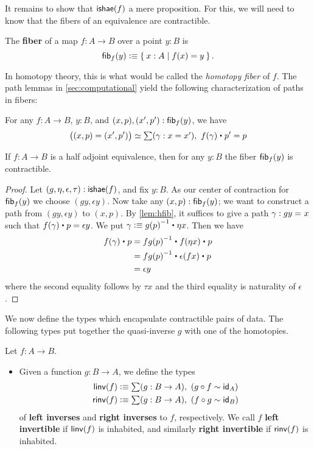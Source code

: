 It remains to show that $\mathsf{ishae}(f)$ a mere proposition.
For this, we will need to know that the fibers of an equivalence are contractible.

\begin{defn}
  The \textbf{fiber} of a map $f:A\to B$ over a point $y:B$ is
  \[ \mathsf{fib}_{f}(y) \vcentcolon\equiv \Set{x:A | f(x) = y}.\]
\end{defn}

In homotopy theory, this is what would be called the \emph{homotopy fiber} of $f$.
The path lemmas in \autoref{sec:computational} yield the following characterization of paths in fibers:

\begin{lem}\label{lem:hfib}
  For any $f : A \to B$, $y : B$, and $(x,p),(x',p') : \mathsf{fib}_{f}(y)$, we have
  \[ \big((x,p) = (x',p')\big) \simeq \sm{\gamma : x = x'} f(\gamma) \ct p' = p \qedhere\]
\end{lem}

\begin{thm}\label{thm:contr-hae}
  If $f:A\to B$ is a half adjoint equivalence, then for any $y:B$ the fiber $\mathsf{fib}_{f}(y)$ is contractible.
\end{thm}
\begin{proof}
  Let $(g,\eta,\epsilon,\tau) : \mathsf{ishae}(f)$, and fix $y : B$.
  As our center of contraction for $\mathsf{fib}_{f}(y)$ we choose $(gy, \epsilon y)$.
  Now take any $(x,p) : \mathsf{fib}_{f}(y)$; we want to construct a path from $(gy, \epsilon y)$ to $(x,p)$.
  By \autoref{lem:hfib}, it suffices to give a path $\gamma : gy =_{} x$ such that $\ap f\gamma \ct p = \epsilon y$.
  We put $\gamma \defeq \opp{g(p)} \ct \eta x$.
  Then we have 
  \begin{align*}
    f(\gamma) \ct p & = \opp{fg(p)} \ct f (\eta x) \ct p \\
    & = \opp{fg(p)} \ct \epsilon(fx) \ct p \\
    & = \epsilon y
  \end{align*}
  where the second equality follows by $\tau x$ and the third equality is naturality of $\epsilon$.
\end{proof}

We now define the types which encapsulate contractible pairs of data.
The following types put together the quasi-inverse $g$ with one of the homotopies.

\begin{defn}
  Let $f:A\to B$.
  \begin{itemize}
  \item Given a function $g:B\to A$, we define the types 
    \begin{align*}
      \linv(f) &\defeq \sm{g:B\to A} (g\circ f\htpy \idfunc[A])\\
      \rinv(f) &\defeq \sm{g:B\to A} (f\circ g\htpy \idfunc[B])
    \end{align*}
  of \textbf{left inverses} and \textbf{right inverses} to $f$, respectively.
  We call $f$ \textbf{left invertible} if $\mathsf{linv}(f)$ is inhabited, and similarly \textbf{right invertible} if $\mathsf{rinv}(f)$ is inhabited.
  \end{itemize}
\end{defn}


